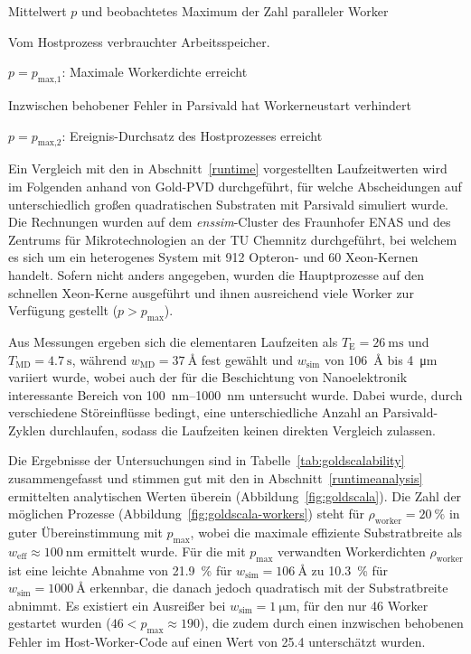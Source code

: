 \begin{table}[b!]
\begin{threeparttable}
    \begin{tablenotes}
    \item[a] Mittelwert $p$ und beobachtetes Maximum der Zahl paralleler Worker
    \item[b] Vom Hostprozess verbrauchter Arbeitsspeicher.
    \item[c] $p = p_\text{max,1}$: Maximale Workerdichte erreicht
    \item[d] Inzwischen behobener Fehler in Parsivald hat Workerneustart verhindert
    \item[e] $p = p_\text{max,2}$: Ereignis-Durchsatz des Hostprozesses erreicht
    \end{tablenotes}

  \end{threeparttable}
\end{table}

Ein Vergleich mit den in Abschnitt~\ref{runtime} vorgestellten Laufzeitwerten wird im Folgenden anhand von Gold-PVD durchgeführt, für welche Abscheidungen auf unterschiedlich großen quadratischen Substraten mit Parsivald simuliert wurde.
Die Rechnungen wurden auf dem \textit{enssim}-Cluster des Fraunhofer ENAS und des Zentrums für Mikrotechnologien an der TU Chemnitz durchgeführt, bei welchem es sich um ein heterogenes System mit \num{912} Opteron- und \num{60} Xeon-Kernen handelt.
Sofern nicht anders angegeben, wurden die Hauptprozesse auf den schnellen Xeon-Kerne ausgeführt und ihnen ausreichend viele Worker zur Verfügung gestellt ($p > p_\text{max}$).

Aus Messungen ergeben sich die elementaren Laufzeiten als $T_\text{E} = \SI{26}{\milli\second}$ und $T_\text{MD} = \SI{4.7}{\second}$, während $w_\text{MD} = \SI{37}{\angstrom}$ fest gewählt und $w_\text{sim}$ von \SI{106}{\angstrom} bis \SI{4}{\micro\meter} variiert wurde, wobei auch der für die Beschichtung von Nanoelektronik interessante Bereich von \SIrange{100}{1000}{\nano\meter} untersucht wurde.
Dabei wurde, durch verschiedene Störeinflüsse bedingt, eine unterschiedliche Anzahl an Parsivald-Zyklen durchlaufen, sodass die Laufzeiten keinen direkten Vergleich zulassen.

Die Ergebnisse der Untersuchungen sind in Tabelle~\ref{tab:goldscalability} zusammengefasst und stimmen gut mit den in Abschnitt~\ref{runtimeanalysis} ermittelten analytischen Werten überein (Abbildung~\ref{fig:goldscala}).
Die Zahl der möglichen Prozesse (Abbildung~\ref{fig:goldscala-workers}) steht für $\rho_\text{worker}=\SI{20}{\percent}$ in guter Übereinstimmung mit $p_\text{max}$, wobei die maximale effiziente Substratbreite als $w_\text{eff} \approx \SI{100}{\nano\meter}$ ermittelt wurde.
Für die mit $p_\text{max}$ verwandten Workerdichten $\rho_\text{worker}$ ist eine leichte Abnahme von \SI{21.9}{\percent} für $w_\text{sim} = \SI{106}{\angstrom}$ zu \SI{10.3}{\percent} für $w_\text{sim} = \SI{1000}{\angstrom}$ erkennbar, die danach jedoch quadratisch mit der Substratbreite abnimmt.
Es existiert ein Ausreißer bei $w_\text{sim} = \SI{1}{\micro\meter}$, für den nur 46 Worker gestartet wurden ($\num{46} < p_\text{max} \approx \num{190}$), die zudem durch einen inzwischen behobenen Fehler im Host-Worker-Code auf einen Wert von \num{25.4} unterschätzt wurden.


